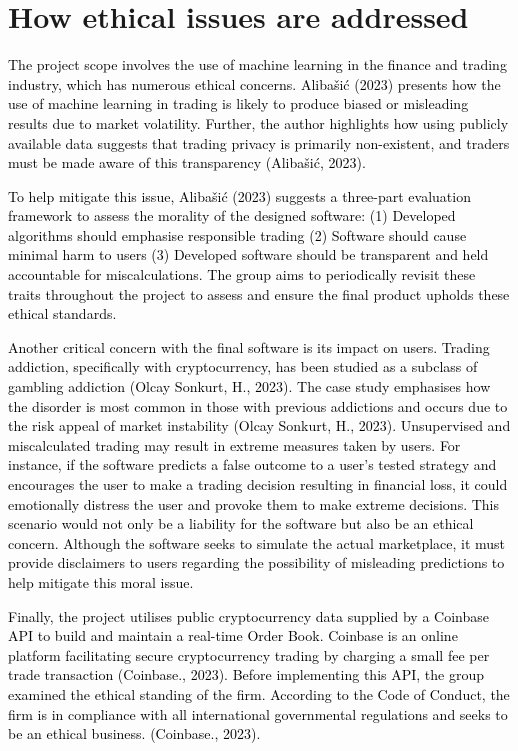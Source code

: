 \documentclass[acmtog, nonacm]{acmart}
\begin{document}
\appendix

\section{How ethical issues are addressed}
\setlength{\parindent}{20pt}
\textcolor{black}{The project scope involves the use of machine learning in the finance and trading industry, which has numerous ethical concerns. Alibašić (2023) presents how the use of machine learning in trading is likely to produce biased or misleading results due to market volatility. Further, the author highlights how using publicly available data suggests that trading privacy is primarily non-existent, and traders must be made aware of this transparency (Alibašić, 2023).}

\textcolor{black}{To help mitigate this issue, Alibašić (2023) suggests a three-part evaluation framework to assess the morality of the designed software: (1) Developed algorithms should emphasise responsible trading (2) Software should cause minimal harm to users (3) Developed software should be transparent and held accountable for miscalculations. The group aims to periodically revisit these traits throughout the project to assess and ensure the final product upholds these ethical standards.}

\textcolor{black}{Another critical concern with the final software is its impact on users. Trading addiction, specifically with cryptocurrency, has been studied as a subclass of gambling addiction (Olcay Sonkurt, H., 2023). The case study emphasises how the disorder is most common in those with previous addictions and occurs due to the risk appeal of market instability (Olcay Sonkurt, H., 2023). Unsupervised and miscalculated trading may result in extreme measures taken by users. For instance, if the software predicts a false outcome to a user's tested strategy and encourages the user to make a trading decision resulting in financial loss, it could emotionally distress the user and provoke them to make extreme decisions. This scenario would not only be a liability for the software but also be an ethical concern. Although the software seeks to simulate the actual marketplace, it must provide disclaimers to users regarding the possibility of misleading predictions to help mitigate this moral issue.}

\textcolor{black}{Finally, the project utilises public cryptocurrency data supplied by a Coinbase API to build and maintain a real-time Order Book. Coinbase is an online platform facilitating secure cryptocurrency trading by charging a small fee per trade transaction (Coinbase., 2023). Before implementing this API, the group examined the ethical standing of the firm. According to the Code of Conduct, the firm is in compliance with all international governmental regulations and seeks to be an ethical business. (Coinbase., 2023). 
}
\end{document}
